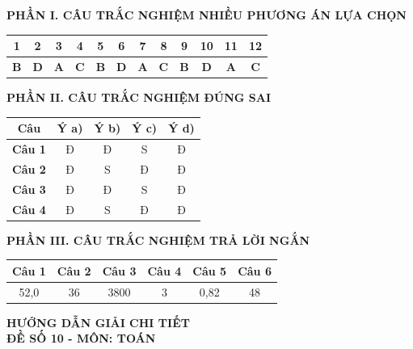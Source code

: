 \documentclass[12pt,a4paper]{article}
\begin{document}
\noindent\textbf{\large PHẦN I. CÂU TRẮC NGHIỆM NHIỀU PHƯƠNG ÁN LỰA CHỌN}
\begin{center}
\renewcommand{\arraystretch}{1.25}
\begin{tabular}{|c|c|c|c|c|c|c|c|c|c|c|c|}
\hline
\textbf{1} & \textbf{2} & \textbf{3} & \textbf{4} & \textbf{5} & \textbf{6} & \textbf{7} & \textbf{8} & \textbf{9} & \textbf{10} & \textbf{11} & \textbf{12} \\ \hline
\textbf{B} & \textbf{D} & \textbf{A} & \textbf{C} & \textbf{B} & \textbf{D} & \textbf{A} & \textbf{C} & \textbf{B} & \textbf{D} & \textbf{A} & \textbf{C} \\ \hline
\end{tabular}
\end{center}

\vspace{0.3cm}
\noindent\textbf{\large PHẦN II. CÂU TRẮC NGHIỆM ĐÚNG SAI}
\begin{center}
\renewcommand{\arraystretch}{1.25}
\begin{tabular}{|c|c|c|c|c|}
\hline
\textbf{Câu} & \textbf{Ý a)} & \textbf{Ý b)} & \textbf{Ý c)} & \textbf{Ý d)} \\ \hline
\textbf{Câu 1} & Đ & Đ & S & Đ \\ \hline
\textbf{Câu 2} & Đ & S & Đ & Đ \\ \hline
\textbf{Câu 3} & Đ & Đ & S & Đ \\ \hline
\textbf{Câu 4} & Đ & S & Đ & Đ \\ \hline
\end{tabular}
\end{center}

\vspace{0.3cm}
\noindent\textbf{\large PHẦN III. CÂU TRẮC NGHIỆM TRẢ LỜI NGẮN}
\begin{center}
\renewcommand{\arraystretch}{1.25}
\begin{tabular}{|c|c|c|c|c|c|}
\hline
\textbf{Câu 1} & \textbf{Câu 2} & \textbf{Câu 3} & \textbf{Câu 4} & \textbf{Câu 5} & \textbf{Câu 6} \\ \hline
52,0 & 36 & 3800 & 3 & 0,82 & 48 \\ \hline
\end{tabular}
\end{center}

\newpage
\begin{center}
    {\Large\textbf{HƯỚNG DẪN GIẢI CHI TIẾT}}\\[4pt]
    \textbf{ĐỀ SỐ 10 - MÔN: TOÁN}
\end{center}
\vspace{0.3cm}
\end{document}
